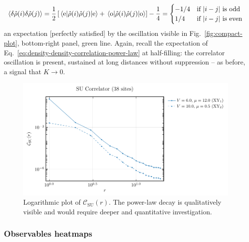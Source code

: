 \[
	\ev{\delta \hat \rho(i) \delta \hat \rho(j)} = \frac{1}{2} \left[
		\mel{\mathrm{e}}{\hat \rho(i) \hat \rho(j)}{\mathrm{e}} + \mel{\mathrm{o}}{\hat \rho(i) \hat \rho(j)}{\mathrm{o}}
	\right] - \frac{1}{4} = \begin{cases}
		-1/4 &\text{if $\abs{i-j}$ is odd} \\
		1/4 &\text{if $\abs{i-j}$ is even} 
	\end{cases}
\]
an expectation {\color{tabred} [perfectly satisfied]} by the oscillation visible in Fig.~\ref{fig:compact-plot}, bottom-right panel, green line. Again, recall the expectation of Eq.~\eqref{eq:density-density-correlation-power-law} at half-filling: the correlator oscillation is present, sustained at long distances without suppression -- as before, a signal that $K \to 0$.

\begin{figure}
	\centering
	\includegraphics{../Project/analysis/states-properties/su-correlator_L=38.pdf}
	\caption{Logarithmic plot of $\mathcal{C}_\mathrm{SU}(r)$. The power-law decay is qualitatively visible and would require deeper and quantitative investigation.}
	\label{su-correlator-loglog}
\end{figure}

\subsubsection{Observables heatmaps}

